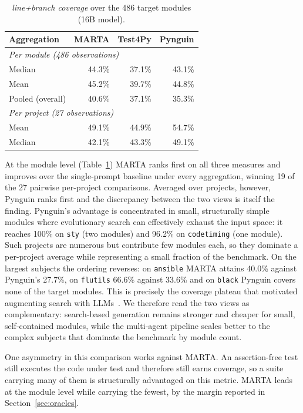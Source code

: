 \documentclass{llncs}
\begin{document}
\begin{table}[htpb]
\centering
\caption{\emph{line+branch coverage} over the 486 target modules (16B model).}
\label{tab:coverage}
\begin{tabular}{lrrr}
\toprule
Aggregation & MARTA & Test4Py & Pynguin \\
\midrule
\multicolumn{4}{l}{\textit{Per module (486 observations)}} \\
\quad Median            & 44.3\% & 37.1\% & 43.1\% \\
\quad Mean              & 45.2\% & 39.7\% & 44.8\% \\
\quad Pooled (overall)  & 40.6\% & 37.1\% & 35.3\% \\
\midrule
\multicolumn{4}{l}{\textit{Per project (27 observations)}} \\
\quad Mean              & 49.1\%          & 44.9\% & 54.7\% \\
\quad Median            & 42.1\%          & 43.3\% & 49.1\% \\
\bottomrule
\end{tabular}
\end{table}

At the module level (Table~\ref{tab:coverage}) MARTA ranks first on all three
measures and improves over the single-prompt baseline under every aggregation,
winning 19 of the 27 pairwise per-project comparisons. Averaged over projects,
however, Pynguin ranks first and the discrepancy between the two views is itself the
finding. Pynguin's advantage is concentrated in small, structurally simple modules
where evolutionary search can effectively exhaust the input space: it reaches 100\%
on \texttt{sty} (two modules) and 96.2\% on \texttt{codetiming} (one module). Such
projects are numerous but contribute few modules each, so they dominate a per-project
average while representing a small fraction of the benchmark. On the largest subjects
the ordering reverses: on \texttt{ansible} MARTA attains 40.0\% against Pynguin's
27.7\%, on \texttt{flutils} 66.6\% against 33.6\% and on \texttt{black} Pynguin
covers none of the target modules. This is precisely the coverage plateau that
motivated augmenting search with LLMs~\cite{lemieux2023codamosa}. We therefore read
the two views as complementary: search-based generation remains stronger and cheaper
for small, self-contained modules, while the multi-agent pipeline scales better to
the complex subjects that dominate the benchmark by module count.

One asymmetry in this comparison works against MARTA. An assertion-free test still
executes the code under test and therefore still earns coverage, so a suite carrying
many of them is structurally advantaged on this metric. MARTA leads at the module
level while carrying the fewest, by the margin reported in
Section~\ref{sec:oracles}.
\end{document}
